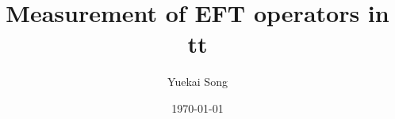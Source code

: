 \documentclass{beamer}
\title{Measurement of EFT operators in tt}
\author{Yuekai Song}
\institute{ZJU}
\date{\today}
\begin{document}
\frame{\titlepage}

\begin{frame}
    \begin{multicols}{4}
        \tableofcontents[sections={1-2}] %
    \end{multicols}
\end{frame}

\begin{frame}
    \begin{multicols}{3}
        \tableofcontents[sections={3}]
    \end{multicols}
\end{frame}

\begin{frame}
    \begin{multicols}{3}
        \tableofcontents[sections={4}]
    \end{multicols}
\end{frame}
\end{document}
